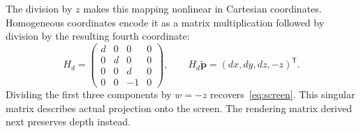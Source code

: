 \documentclass[11pt,a4paper]{article}
\newcommand{\vect}[1]{\boldsymbol{#1}}
\numberwithin{equation}{section}
\begin{document}
The division by $z$ makes this mapping nonlinear in Cartesian coordinates. Homogeneous coordinates encode it as a matrix multiplication followed by division by the resulting fourth coordinate:
\begin{equation}
H_d=\begin{pmatrix}d&0&0&0\\0&d&0&0\\0&0&d&0\\0&0&-1&0\end{pmatrix},
\qquad H_d\widetilde{\vect p}=(dx,dy,dz,-z)^{\mathsf T}.
\end{equation}
Dividing the first three components by $w=-z$ recovers~\eqref{eq:screen}. This singular matrix describes actual projection onto the screen. The rendering matrix derived next preserves depth instead.

\newpage
\end{document}
